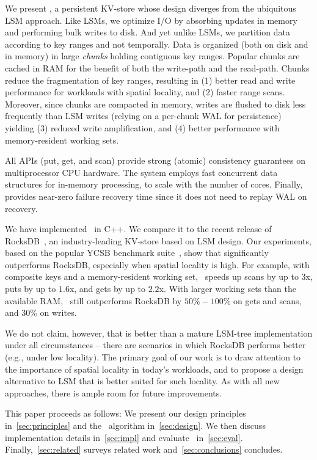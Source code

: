 We present \sys, a persistent KV-store whose design diverges from the ubiquitous LSM approach.  
Like  LSMs,  we optimize I/O by absorbing updates in memory and performing bulk writes to disk. 
And yet unlike LSMs, we partition data according to key ranges and not temporally.
Data is  organized (both on disk and in memory) in large \emph{chunks} holding contiguous key ranges.
Popular chunks are cached in RAM for the benefit of  both the write-path and the read-path.
Chunks reduce the fragmentation of key ranges, resulting in 
(1) better read and write performance for workloads with spatial locality,  and
(2) faster range scans. 
Moreover, since chunks  are compacted in memory, writes are 
flushed to disk less frequently than LSM writes (relying on a per-chunk WAL for persistence)
yielding 
(3) reduced write amplification, and 
(4) better performance with memory-resident working sets.

All \sys\/ APIs (put, get, and scan) provide strong (atomic) consistency guarantees on multiprocessor CPU hardware. 
The system employs fast concurrent data structures for in-memory processing, to scale with the number of cores. 
Finally, \sys\/ provides near-zero failure recovery time since it does not need to replay WAL on recovery.

We have implemented \sys\ in C++. We compare it to the recent release of RocksDB~\cite{RocksDB}, 
an industry-leading KV-store  based on LSM design. Our experiments, based on the popular 
YCSB benchmark suite~\cite{YCSB}, show that \sys\/ significantly outperforms  RocksDB, 
especially when spatial  locality is high. 
For example, with composite keys and a memory-resident working set, \sys\  speeds up scans 
by up to 3x, puts by up to $1.6$x, and gets by up to $2.2$x. With larger working sets than the 
available RAM, \sys\ still outperforms RocksDB by $50\% - 100\%$ on gets  and scans, 
and $30\%$ on writes. 

We do not claim, however, that \sys\/ is better than a mature LSM-tree implementation
under all circumstances -- there are scenarios in which RocksDB performs better (e.g., under low locality). 
The primary goal of our work is to draw attention to the importance of spatial locality in 
today's workloads, and to propose a design alternative to LSM that is better suited for such locality. 
As with all new approaches, there is ample  room for future improvements. 
 
 This paper proceeds as follows:
We present our design principles in~\cref{sec:principles} and  the \sys\ algorithm 
in~\cref{sec:design}. We then discuss implementation details in~\cref{sec:impl} and evaluate 
\sys\ in~\cref{sec:eval}.  Finally,~\cref{sec:related}   surveys related work and~\cref{sec:conclusions}
concludes. 
